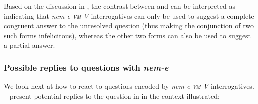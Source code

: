\documentclass[output=paper,colorlinks,citecolor=brown]{langscibook}
\begin{document}
	\noindent Based on the discussion in , the contrast  between  and   can be interpreted as indicating  that \textit{nem-e \textsc{vm}-V} interrogatives can only be used to suggest a complete congruent answer to the unresolved question (thus making the conjunction of two such forms infelicitous), whereas the other two forms can also be used to suggest a partial answer. 
	
\subsubsection{Possible replies to questions with \textit{nem-e}}\label{sect:possible_answers}
	
	We look next at how to react to questions encoded by \textit{nem-e \textsc{vm}-V} interrogatives. -- present potential replies to the question in  in the context illustrated:
	
\end{document}
